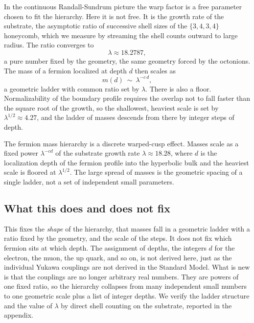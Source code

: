 In the continuous Randall-Sundrum picture the warp factor is a free parameter chosen to fit the hierarchy. Here it is
not free. It is the growth rate of the substrate, the asymptotic ratio of successive shell sizes of the $\{3,4,3,4\}$
honeycomb, which we measure by streaming the shell counts outward to large radius. The ratio converges to
\begin{equation}
  \lambda \approx 18.2787 ,
\end{equation}
a pure number fixed by the geometry, the same geometry forced by the octonions. The mass of a fermion localized at
depth $d$ then scales as
\begin{equation}
  m(d) \ \sim \ \lambda^{-c\,d},
\end{equation}
a geometric ladder with common ratio set by $\lambda$. There is also a floor. Normalizability of the boundary profile
requires the overlap not to fall faster than the square root of the growth, so the shallowest, heaviest scale is set by
$\lambda^{1/2} \approx 4.27$, and the ladder of masses descends from there by integer steps of depth.

\begin{result}
The fermion mass hierarchy is a discrete warped-cusp effect. Masses scale as a fixed power $\lambda^{-cd}$ of the
substrate growth rate $\lambda \approx 18.28$, where $d$ is the localization depth of the fermion profile into the
hyperbolic bulk and the heaviest scale is floored at $\lambda^{1/2}$. The large spread of masses is the geometric
spacing of a single ladder, not a set of independent small parameters.
\end{result}

\subsection{What this does and does not fix}

This fixes the \emph{shape} of the hierarchy, that masses fall in a geometric ladder with a ratio fixed by the
geometry, and the scale of the steps. It does not fix which fermion sits at which depth. The assignment of depths, the
integers $d$ for the electron, the muon, the up quark, and so on, is not derived here, just as the individual Yukawa
couplings are not derived in the Standard Model. What is new is that the couplings are no longer arbitrary real
numbers. They are powers of one fixed ratio, so the hierarchy collapses from many independent small numbers to one
geometric scale plus a list of integer depths. We verify the ladder structure and the value of $\lambda$ by direct
shell counting on the substrate, reported in the appendix.

